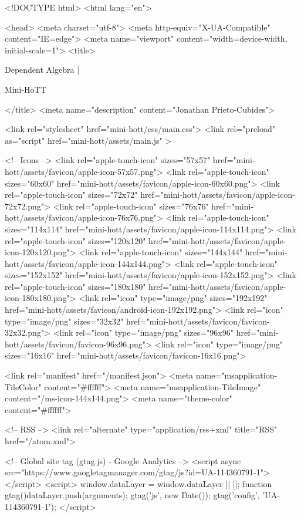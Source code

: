 <!DOCTYPE html>
<html lang="en">

<head>
  <meta charset="utf-8">
  <meta http-equiv="X-UA-Compatible" content="IE=edge">
  <meta name="viewport" content="width=device-width, initial-scale=1">
  <title>
    
      
        Dependent Algebra |
      
        Mini-HoTT
    
  </title>
  <meta name="description" content="Jonathan Prieto-Cubides">

  <link rel="stylesheet" href="mini-hott/css/main.css">
  <link rel="preload" as="script" href="mini-hott/assets/main.js" >

  <!-- Icons -->
  <link rel="apple-touch-icon" sizes="57x57" href="mini-hott/assets/favicon/apple-icon-57x57.png">
  <link rel="apple-touch-icon" sizes="60x60" href="mini-hott/assets/favicon/apple-icon-60x60.png">
  <link rel="apple-touch-icon" sizes="72x72" href="mini-hott/assets/favicon/apple-icon-72x72.png">
  <link rel="apple-touch-icon" sizes="76x76" href="mini-hott/assets/favicon/apple-icon-76x76.png">
  <link rel="apple-touch-icon" sizes="114x114" href="mini-hott/assets/favicon/apple-icon-114x114.png">
  <link rel="apple-touch-icon" sizes="120x120" href="mini-hott/assets/favicon/apple-icon-120x120.png">
  <link rel="apple-touch-icon" sizes="144x144" href="mini-hott/assets/favicon/apple-icon-144x144.png">
  <link rel="apple-touch-icon" sizes="152x152" href="mini-hott/assets/favicon/apple-icon-152x152.png">
  <link rel="apple-touch-icon" sizes="180x180" href="mini-hott/assets/favicon/apple-icon-180x180.png">
  <link rel="icon" type="image/png" sizes="192x192"  href="mini-hott/assets/favicon/android-icon-192x192.png">
  <link rel="icon" type="image/png" sizes="32x32" href="mini-hott/assets/favicon/favicon-32x32.png">
  <link rel="icon" type="image/png" sizes="96x96" href="mini-hott/assets/favicon/favicon-96x96.png">
  <link rel="icon" type="image/png" sizes="16x16" href="mini-hott/assets/favicon/favicon-16x16.png">

  <link rel="manifest" href="/manifest.json">
  <meta name="msapplication-TileColor" content="#ffffff">
  <meta name="msapplication-TileImage" content="/ms-icon-144x144.png">
  <meta name="theme-color" content="#ffffff">

  <!-- RSS -->
  <link rel="alternate" type="application/rss+xml" title="RSS" href="/atom.xml">

  <!-- Global site tag (gtag.js) - Google Analytics -->
  <script async src="https://www.googletagmanager.com/gtag/js?id=UA-114360791-1"></script>
  <script>
    window.dataLayer = window.dataLayer || [];
    function gtag(){dataLayer.push(arguments);}
    gtag('js', new Date());
    gtag('config', 'UA-114360791-1');
  </script>

